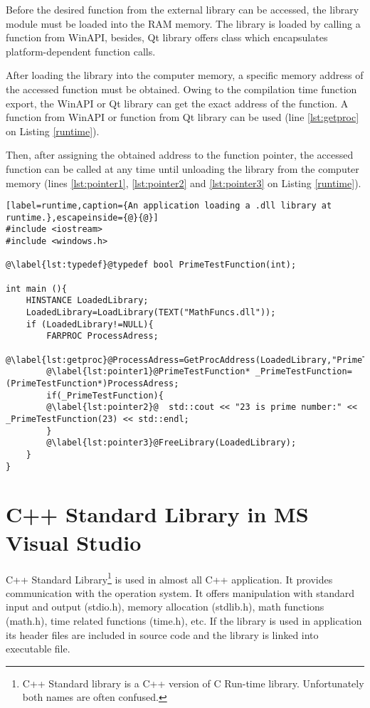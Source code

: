 Before the desired function from the external library can be accessed, the library module must be loaded into the RAM memory. The library is loaded by calling a  function from WinAPI, besides, Qt library offers  class which encapsulates platform-dependent function calls.

After loading the library into the computer memory, a specific memory address of the accessed function must be obtained. Owing to the compilation time function export, the WinAPI or Qt library can get the exact address of the function. A  function from WinAPI or  function from Qt library can be used (line \ref{lst:getproc} on Listing \ref{runtime}).

Then, after assigning the obtained address to the function pointer, the accessed function can be called at any time until unloading the library from the computer memory (lines \ref{lst:pointer1}, \ref{lst:pointer2} and \ref{lst:pointer3} on Listing \ref{runtime}).

\begin{lstlisting}[label=runtime,caption={An application loading a .dll library at runtime.},escapeinside={@}{@}]
#include <iostream>
#include <windows.h>

@\label{lst:typedef}@typedef bool PrimeTestFunction(int);

int main (){
	HINSTANCE LoadedLibrary;
	LoadedLibrary=LoadLibrary(TEXT("MathFuncs.dll"));
	if (LoadedLibrary!=NULL){
		FARPROC ProcessAdress;
		@\label{lst:getproc}@ProcessAdress=GetProcAddress(LoadedLibrary,"PrimeTest");
		@\label{lst:pointer1}@PrimeTestFunction* _PrimeTestFunction=(PrimeTestFunction*)ProcessAdress;
		if(_PrimeTestFunction){
		@\label{lst:pointer2}@	std::cout << "23 is prime number:" << _PrimeTestFunction(23) << std::endl;
		}
		@\label{lst:pointer3}@FreeLibrary(LoadedLibrary);
	}
}
\end{lstlisting}



\section{C++ Standard Library in MS Visual Studio}

\label{standardlibrary}
C++ Standard Library\footnote{C++ Standard library is a C++ version of C Run-time library. Unfortunately both names are often confused.} is used in almost all C++ application. It provides communication with the operation system. It offers manipulation with standard input and output (stdio.h), memory allocation (stdlib.h), math functions (math.h), time related functions (time.h), etc. If the library is used in application its header files are included in source code and the library is linked into executable file.

